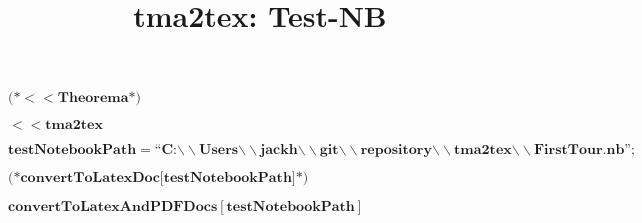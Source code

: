 \documentclass{article}
\begin{document}
\title{tma2tex: Test-NB}
\author{}
\date{}
\maketitle

\begin{doublespace}
\noindent\(\pmb{\text{(*$<<$Theorema$\grave{ }$*)}}\)
\end{doublespace}

\begin{doublespace}
\noindent\(\pmb{<<\text{tma2tex$\grave{ }$}}\)
\end{doublespace}

\begin{doublespace}
\noindent\(\pmb{\text{testNotebookPath} = \text{{``}C:$\backslash \backslash $Users$\backslash \backslash $jackh$\backslash \backslash $git$\backslash
\backslash $repository$\backslash \backslash $tma2tex$\backslash \backslash $FirstTour.nb{''}};}\)
\end{doublespace}

\begin{doublespace}
\noindent\(\pmb{\text{(*convertToLatexDoc[testNotebookPath]*)}}\)
\end{doublespace}

\begin{doublespace}
\noindent\(\pmb{\text{convertToLatexAndPDFDocs}[\text{testNotebookPath}]}\)
\end{doublespace}
\end{document}
